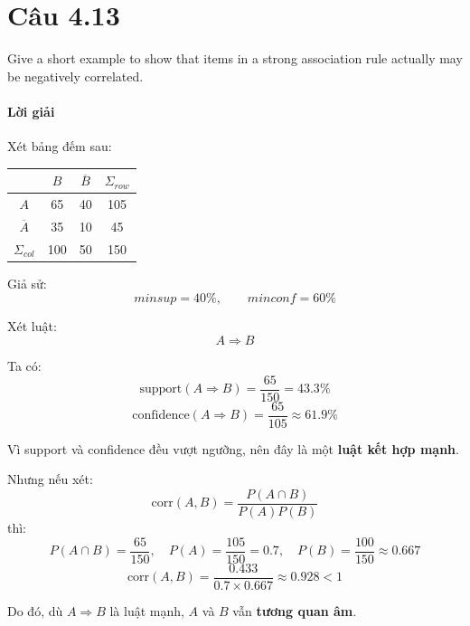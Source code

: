 \section{Câu 4.13}
Give a short example to show that items in a strong association rule actually may be negatively correlated.

\paragraph{Lời giải}
Xét bảng đếm sau:

\begin{center}
    \begin{tabular}{|c|c|c|c|}
        \hline
                           & $B$ & $\overline{B}$ & $\Sigma_{row}$ \\
        \hline
        $A$                & 65  & 40             & 105            \\
        \hline
        $\overline{A}$     & 35  & 10             & 45             \\
        \hline
        $\Sigma_{col}$     & 100 & 50             & 150            \\
        \hline
    \end{tabular}
\end{center}

Giả sử:
\[
    \textit{minsup}=40\%, \qquad \textit{minconf}=60\%
\]

Xét luật:
\[
    A \Rightarrow B
\]

Ta có:
\[
    \mathrm{support}(A \Rightarrow B)=\frac{65}{150}=43.3\%
\]
\[
    \mathrm{confidence}(A \Rightarrow B)=\frac{65}{105}\approx 61.9\%
\]

Vì support và confidence đều vượt ngưỡng, nên đây là một \textbf{luật kết hợp mạnh}.

Nhưng nếu xét:
\[
    \mathrm{corr}(A,B)=\frac{P(A\cap B)}{P(A)P(B)}
\]
thì:
\[
    P(A\cap B)=\frac{65}{150},\quad P(A)=\frac{105}{150}=0.7,\quad P(B)=\frac{100}{150}\approx 0.667
\]
\[
    \mathrm{corr}(A,B)=\frac{0.433}{0.7\times 0.667}\approx 0.928 < 1
\]

Do đó, dù $A \Rightarrow B$ là luật mạnh, $A$ và $B$ vẫn \textbf{tương quan âm}.
